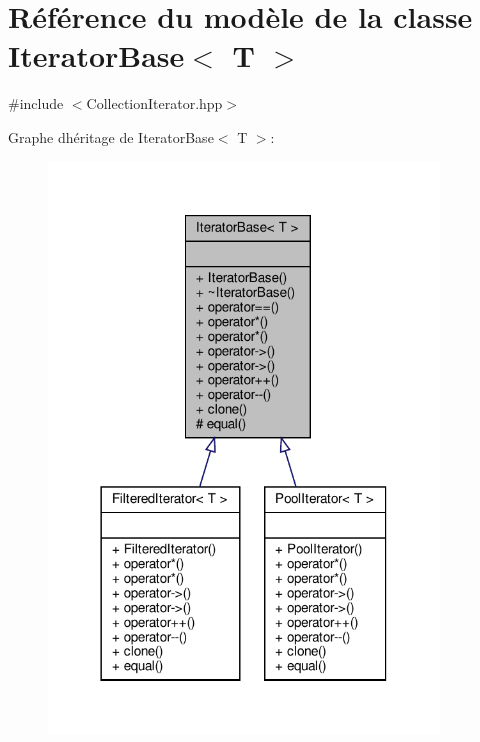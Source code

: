 \hypertarget{class_iterator_base}{}\section{Référence du modèle de la classe Iterator\+Base$<$ T $>$}
\label{class_iterator_base}


{\ttfamily \#include $<$Collection\+Iterator.\+hpp$>$}



Graphe d\textquotesingle{}héritage de Iterator\+Base$<$ T $>$\+:\nopagebreak
\begin{figure}[H]
\begin{center}
\leavevmode
\includegraphics[width=294pt]{class_iterator_base__inherit__graph}
\end{center}
\end{figure}


